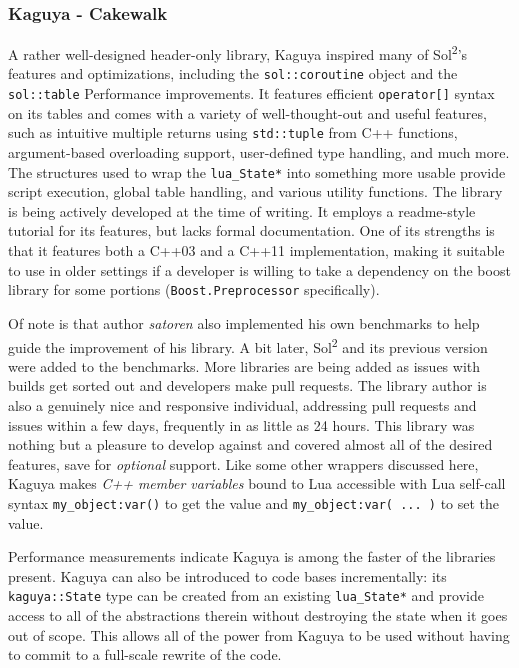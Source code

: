 \documentclass[conference,compsoc]{IEEEtran}
\newcommand{\soltwo}{Sol\textsuperscript{2}}
\begin{document}
\subsubsection{Kaguya - Cakewalk}

A rather well-designed header-only library, Kaguya\cite{kaguya} inspired many of \soltwo{}'s features and optimizations, including the \lstinline|sol::coroutine| object and the \lstinline|sol::table| Performance improvements. It features efficient \lstinline|operator[]| syntax on its tables and comes with a variety of well-thought-out and useful features, such as intuitive multiple returns using \lstinline|std::tuple| from C++ functions, argument-based overloading support, user-defined type handling, and much more. The structures used to wrap the \lstinline|lua_State*| into something more usable provide script execution, global table handling, and various utility functions. The library is being actively developed at the time of writing. It employs a readme-style tutorial for its features, but lacks formal documentation. One of its strengths is that it features both a C++03 and a C++11 implementation, making it suitable to use in older settings if a developer is willing to take a dependency on the boost\cite{boost} library for some portions (\lstinline|Boost.Preprocessor| specifically).

Of note is that author \emph{satoren} also implemented his own benchmarks\cite{satoren-bench} to help guide the improvement of his library. A bit later, \soltwo{} and its previous version were added to the benchmarks. More libraries are being added as issues with builds get sorted out and developers make pull requests. The library author is also a genuinely nice and responsive individual, addressing pull requests and issues within a few days, frequently in as little as 24 hours. This library was nothing but a pleasure to develop against and covered almost all of the desired features, save for \emph{optional} support. Like some other wrappers discussed here, Kaguya makes \emph{C++ member variables} bound to Lua accessible with Lua self-call syntax \lstinline|my_object:var()| to get the value and \lstinline|my_object:var( ... )| to set the value.

Performance measurements indicate Kaguya is among the faster of the libraries present. Kaguya can also be introduced to code bases incrementally: its \lstinline|kaguya::State| type can be created from an existing \lstinline|lua_State*| and provide access to all of the abstractions therein without destroying the state when it goes out of scope. This allows all of the power from Kaguya to be used without having to commit to a full-scale rewrite of the code.
\end{document}
